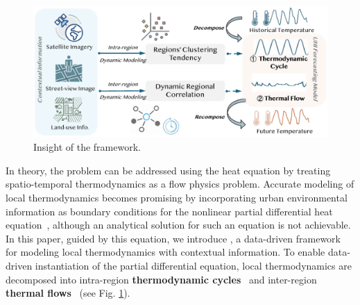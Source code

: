 \begin{figure}[t!]
    \centering
    \includegraphics[width=1\linewidth]{resources/intro_2.pdf}
    \vspace{-1em}
    \caption{Insight of the framework.}
    \label{fig:intro_method}
    \vspace{-1.5em}
\end{figure}
In theory, the problem can be addressed using the heat equation by treating spatio-temporal thermodynamics as a flow physics problem. Accurate modeling of local thermodynamics becomes promising by incorporating urban environmental information as boundary conditions for the nonlinear partial differential heat equation~\cite{widder1976heat,doob1955probability,lewis2004fundamentals}, although an analytical solution for such an equation is not achievable. In this paper, guided by this equation, we introduce \model, a data-driven framework for modeling local thermodynamics with contextual information. To enable data-driven instantiation of the partial differential equation, local thermodynamics are decomposed into intra-region \textbf{thermodynamic cycles}~\cite{chen2010review,qian2015thermodynamics} and inter-region \textbf{thermal flows}~\cite{lewis2004fundamentals,zienkiewicz1981general} (see Fig. \ref{fig:intro_method}).

